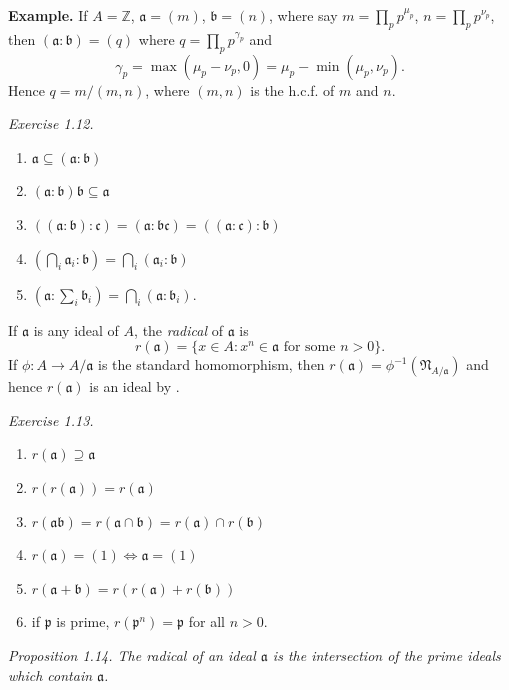 \noindent\textbf{Example.} If $A=\mathbb Z$, $\mathfrak a=(m)$, $\mathfrak b=(n)$, where say $m=\prod_p p^{\mu_p}$, $n=\prod_p p^{\nu_p}$, then $(\mathfrak a:\mathfrak b)=(q)$ where $q=\prod_p p^{\gamma_p}$ and
\[
 \gamma_p=\max(\mu_p-\nu_p,0)=\mu_p-\min(\mu_p,\nu_p).
\]
Hence $q=m/(m,n)$, where $(m,n)$ is the h.c.f. of $m$ and $n$.

\noindent\textit{Exercise 1.12.}
\begin{enumerate}
\renewcommand{\labelenumi}{\roman{enumi})}
\item $\mathfrak a\subseteq(\mathfrak a:\mathfrak b)$
\item $(\mathfrak a:\mathfrak b)\mathfrak b\subseteq\mathfrak a$
\item $((\mathfrak a:\mathfrak b):\mathfrak c)=(\mathfrak a:\mathfrak b\mathfrak c)=((\mathfrak a:\mathfrak c):\mathfrak b)$
\item $(\bigcap_i\mathfrak a_i:\mathfrak b)=\bigcap_i(\mathfrak a_i:\mathfrak b)$
\item $(\mathfrak a:\sum_i\mathfrak b_i)=\bigcap_i(\mathfrak a:\mathfrak b_i)$.
\end{enumerate}

If $\mathfrak a$ is any ideal of $A$, the \textit{radical} of $\mathfrak a$ is
\[
 r(\mathfrak a)=\{x\in A:x^n\in\mathfrak a\text{ for some }n>0\}.
\]
If $\phi:A\longrightarrow A/\mathfrak a$ is the standard homomorphism, then $r(\mathfrak a)=\phi^{-1}(\mathfrak N_{A/\mathfrak a})$ and hence $r(\mathfrak a)$ is an ideal by .

\noindent\textit{Exercise 1.13.}
\begin{enumerate}
\renewcommand{\labelenumi}{\roman{enumi})}
\item $r(\mathfrak a)\supseteq\mathfrak a$
\item $r(r(\mathfrak a))=r(\mathfrak a)$
\item $r(\mathfrak a\mathfrak b)=r(\mathfrak a\cap\mathfrak b)=r(\mathfrak a)\cap r(\mathfrak b)$
\item $r(\mathfrak a)=(1)\Longleftrightarrow\mathfrak a=(1)$
\item $r(\mathfrak a+\mathfrak b)=r(r(\mathfrak a)+r(\mathfrak b))$
\item if $\mathfrak p$ is prime, $r(\mathfrak p^n)=\mathfrak p$ for all $n>0$.
\end{enumerate}

\noindent\textit{Proposition 1.14. The radical of an ideal $\mathfrak a$ is the intersection of the prime ideals which contain $\mathfrak a$.}


